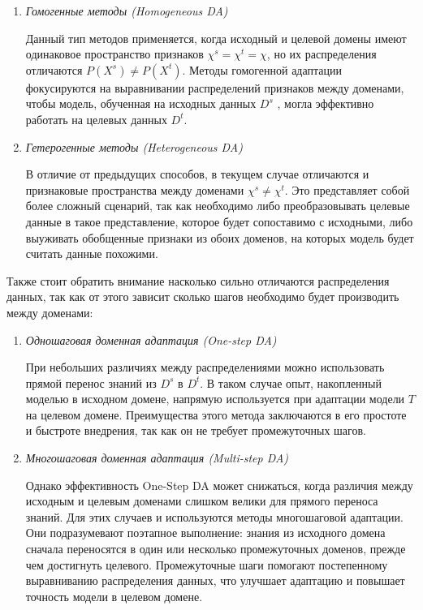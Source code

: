 \begin{enumerate}
\item \textit{Гомогенные методы (Homogeneous DA)}

Данный тип методов применяется, когда исходный и целевой домены имеют одинаковое пространство признаков $\chi^s = \chi^t = \chi$, но их распределения отличаются $P(X^s) \ne P(X^t)$. Методы гомогенной адаптации фокусируются на выравнивании распределений признаков между доменами, чтобы модель, обученная на исходных данных $D^s$ , могла эффективно работать на целевых данных $D^t$.

\item \textit{Гетерогенные методы (Heterogeneous DA)}

В отличие от предыдущих способов, в текущем случае отличаются и признаковые пространства между доменами $\chi^s \ne \chi^t$. Это представляет собой более сложный сценарий, так как необходимо либо преобразовывать целевые данные в такое представление, которое будет сопоставимо с исходными, либо выуживать обобщенные признаки из обоих доменов, на которых модель будет считать данные похожими.

\end{enumerate}

\hfill \break
Также стоит обратить внимание насколько сильно отличаются распределения данных, так как от этого зависит сколько шагов необходимо будет производить между доменами:

\begin{enumerate}
\item \textit{Одношаговая доменная адаптация (One-step DA)}

При небольших различиях между распределениями можно использовать прямой перенос знаний из $D^s$ в $D^t$. В таком случае опыт, накопленный моделью в исходном домене, напрямую используется при адаптации модели $T$ на целевом домене. Преимущества этого метода заключаются в его простоте и быстроте внедрения, так как он не требует промежуточных шагов.

\item \textit{Многошаговая доменная адаптация (Multi-step DA)}

Однако эффективность One-Step DA может снижаться, когда различия между исходным и целевым доменами слишком велики для прямого переноса знаний. Для этих случаев и используются методы многошаговой адаптации. Они подразумевают поэтапное выполнение: знания из исходного домена сначала переносятся в один или несколько промежуточных доменов, прежде чем достигнуть целевого. Промежуточные шаги помогают постепенному выравниванию распределения данных, что улучшает адаптацию и повышает точность модели в целевом домене.

\end{enumerate}

